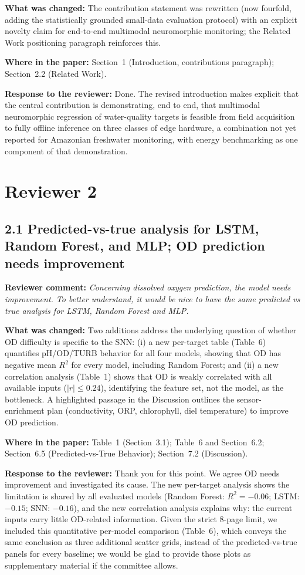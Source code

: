 \documentclass[11pt,a4paper]{article}
\newcommand{\comment}[1]{\textbf{Reviewer comment:} \textit{#1}}
\newcommand{\change}[1]{\textbf{What was changed:} #1}
\newcommand{\where}[1]{\textbf{Where in the paper:} #1}
\newcommand{\resp}[1]{\textbf{Response to the reviewer:} \textcolor{revblue}{#1}}
\newcommand{\pt}[1]{\subsection*{#1}}
\begin{document}
\change{The contribution statement was rewritten (now fourfold, adding the statistically grounded small-data evaluation protocol) with an explicit novelty claim for end-to-end multimodal neuromorphic monitoring; the Related Work positioning paragraph reinforces this.}

\where{Section~1 (Introduction, contributions paragraph); Section~2.2 (Related Work).}

\resp{Done. The revised introduction makes explicit that the central contribution is demonstrating, end to end, that multimodal neuromorphic regression of water-quality targets is feasible from field acquisition to fully offline inference on three classes of edge hardware, a combination not yet reported for Amazonian freshwater monitoring, with energy benchmarking as one component of that demonstration.}

\section*{Reviewer 2}

\pt{2.1 Predicted-vs-true analysis for LSTM, Random Forest, and MLP; OD prediction needs improvement}
\comment{Concerning dissolved oxygen prediction, the model needs improvement. To better understand, it would be nice to have the same predicted vs true analysis for LSTM, Random Forest and MLP.}

\change{Two additions address the underlying question of whether OD difficulty is specific to the SNN: (i) a new per-target table (Table~6) quantifies pH/OD/TURB behavior for all four models, showing that OD has negative mean $R^2$ for every model, including Random Forest; and (ii) a new correlation analysis (Table~1) shows that OD is weakly correlated with all available inputs ($|r| \leq 0.24$), identifying the feature set, not the model, as the bottleneck. A highlighted passage in the Discussion outlines the sensor-enrichment plan (conductivity, ORP, chlorophyll, diel temperature) to improve OD prediction.}

\where{Table~1 (Section~3.1); Table~6 and Section~6.2; Section~6.5 (Predicted-vs-True Behavior); Section~7.2 (Discussion).}

\resp{Thank you for this point. We agree OD needs improvement and investigated its cause. The new per-target analysis shows the limitation is shared by all evaluated models (Random Forest: $R^2=-0.06$; LSTM: $-0.15$; SNN: $-0.16$), and the new correlation analysis explains why: the current inputs carry little OD-related information. Given the strict 8-page limit, we included this quantitative per-model comparison (Table~6), which conveys the same conclusion as three additional scatter grids, instead of the predicted-vs-true panels for every baseline; we would be glad to provide those plots as supplementary material if the committee allows.}
\end{document}
